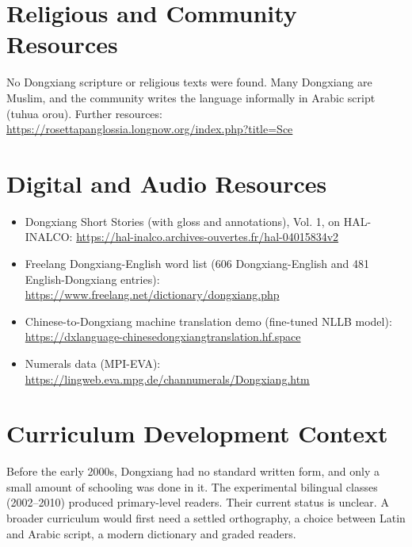 \documentclass[12pt]{article}
\begin{document}
\section{Religious and Community Resources}
No Dongxiang scripture or religious texts were found. Many Dongxiang are Muslim, and the community writes the language informally in Arabic script (tuhua orou). Further resources: \url{https://rosettapanglossia.longnow.org/index.php?title=Sce}

\section{Digital and Audio Resources}
\begin{itemize}
\item Dongxiang Short Stories (with gloss and annotations), Vol. 1, on HAL-INALCO: \url{https://hal-inalco.archives-ouvertes.fr/hal-04015834v2}
\item Freelang Dongxiang-English word list (606 Dongxiang-English and 481 English-Dongxiang entries): \url{https://www.freelang.net/dictionary/dongxiang.php}
\item Chinese-to-Dongxiang machine translation demo (fine-tuned NLLB model): \url{https://dxlanguage-chinesedongxiangtranslation.hf.space}
\item Numerals data (MPI-EVA): \url{https://lingweb.eva.mpg.de/channumerals/Dongxiang.htm}
\end{itemize}

\section{Curriculum Development Context}
Before the early 2000s, Dongxiang had no standard written form, and only a small amount of schooling was done in it. The experimental bilingual classes (2002--2010) produced primary-level readers. Their current status is unclear. A broader curriculum would first need a settled orthography, a choice between Latin and Arabic script, a modern dictionary and graded readers.
\end{document}

